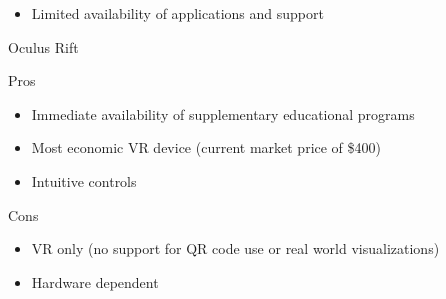 \begin{description}
\begin{description}
\begin{itemize}
                \item Limited availability of applications and support
            \end{itemize}
        \end{description}
        \item Oculus Rift
            \begin{description} 
            \item Pros
            \begin{itemize}
                \item Immediate availability of supplementary educational programs
                \item Most economic VR device (current market price of \$400)
                \item Intuitive controls
            \end{itemize}
        \end{description}
        \begin{description} 
            \item Cons
            \begin{itemize}
                \item VR only (no support for QR code use or real world visualizations)
                \item Hardware dependent
                
            \end{itemize}
        \end{description}
        \end{description}
